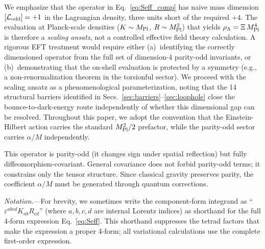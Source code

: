 \documentclass[aps,prd,twocolumn,superscriptaddress,showpacs,preprintnumbers,nofootinbib,longbibliography,floatfix]{revtex4-2}
\newcommand{\MPl}{M_{\rm Pl}}
\begin{document}
We emphasize that the operator in Eq.~\eqref{eq:Seff_comp} has naive mass dimension $[\mathcal{L}_{\rm odd}] = +1$ in the Lagrangian density, three units short of the required $+4$. The evaluation at Planck-scale densities ($K \sim \MPl$, $R \sim \MPl^2$) that yields $\rho_\Lambda = \Xi\,\MPl^4$ is therefore a \textit{scaling ansatz}, not a controlled effective field theory calculation. A rigorous EFT treatment would require either (a)~identifying the correctly dimensioned operator from the full set of dimension-4 parity-odd invariants, or (b)~demonstrating that the on-shell evaluation is protected by a symmetry (e.g., a non-renormalization theorem in the torsionful sector). We proceed with the scaling ansatz as a phenomenological parameterization, noting that the 14 structural barriers identified in Secs.~\ref{sec:barriers}--\ref{sec:loophole} close the bounce-to-dark-energy route independently of whether this dimensional gap can be resolved. Throughout this paper, we adopt the convention that the Einstein-Hilbert action carries the standard $\MPl^2/2$ prefactor, while the parity-odd sector carries $\alpha/M$ independently.

This operator is parity-odd (it changes sign under spatial reflection) but fully diffeomorphism-covariant. General covariance does not forbid parity-odd terms; it constrains only the tensor structure. Since classical gravity preserves parity, the coefficient $\alpha/M$ must be generated through quantum corrections.

\textit{Notation.}---For brevity, we sometimes write the component-form integrand as ``$\varepsilon^{abcd}K_{ab}R_{cd}$'' (where $a,b,c,d$ are internal Lorentz indices) as shorthand for the full 4-form expression Eq.~\eqref{eq:Seff}. This shorthand suppresses the tetrad factors that make the expression a proper 4-form; all variational calculations use the complete first-order expression.
\end{document}
